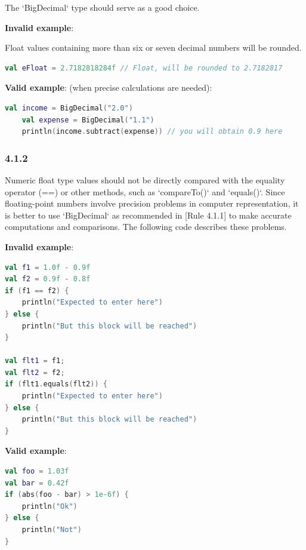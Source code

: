 {{{{The `BigDecimal` type should serve as a good choice.



\textbf{Invalid example}:

Float values containing more than six or seven decimal numbers will be rounded.

\begin{lstlisting}[language=Kotlin]
 val eFloat = 2.7182818284f // Float, will be rounded to 2.7182817
\end{lstlisting}


\textbf{Valid example}: (when precise calculations are needed): 

\begin{lstlisting}[language=Kotlin]
    val income = BigDecimal("2.0")
    val expense = BigDecimal("1.1")
    println(income.subtract(expense)) // you will obtain 0.9 here
\end{lstlisting}


\subsubsection*{\textbf{4.1.2}}
\leavevmode\newline

\label{sec:4.1.2}

Numeric float type values should not be directly compared with the equality operator (==) or other methods, such as `compareTo()` and `equals()`. Since floating-point numbers involve precision problems in computer representation, it is better to use `BigDecimal` as recommended in [Rule 4.1.1] to make accurate computations and comparisons. The following code describes these problems.



\textbf{Invalid example}:

\begin{lstlisting}[language=Kotlin]
val f1 = 1.0f - 0.9f
val f2 = 0.9f - 0.8f
if (f1 == f2) {
    println("Expected to enter here")
} else {
    println("But this block will be reached")
}

val flt1 = f1;
val flt2 = f2;
if (flt1.equals(flt2)) {
    println("Expected to enter here")
} else {
    println("But this block will be reached")
} 
\end{lstlisting}


\textbf{Valid example}:



\begin{lstlisting}[language=Kotlin]
val foo = 1.03f
val bar = 0.42f
if (abs(foo - bar) > 1e-6f) {
    println("Ok")
} else {
    println("Not")
}
\end{lstlisting}


}}}}
